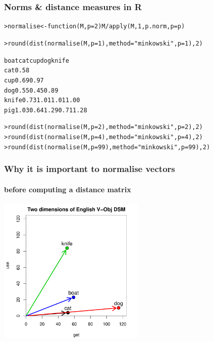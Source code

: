 \begin{frame}[fragile]
  \frametitle{Norms \& distance measures in R}

\ungap
\begin{alltt}\small    
{}
> normalise <- function (M, p=2) M / apply(M, 1, p.norm, p=p)

> round(dist(normalise(M, p=1), method="minkowski", p=1), 2) \begin{Rout}
      boat  cat  cup  dog knife
cat   0.58                     
cup   0.69 0.97                
dog   0.55 0.45 0.89           
knife 0.73 1.01 1.01 1.00      
pig   1.03 0.64 1.29 0.71  1.28 \end{Rout}

> round(dist(normalise(M, p=2), method="minkowski", p=2), 2)
> round(dist(normalise(M, p=4), method="minkowski", p=4), 2)
> round(dist(normalise(M, p=99), method="minkowski", p=99), 2)
\end{alltt}
\end{frame}

\begin{frame}[c]
  \frametitle{Why it is important to normalise vectors}
  \framesubtitle{before computing a distance matrix}

  \begin{center}
    \includegraphics[width=7cm]{img/hieroglyph_2d_3}
  \end{center}
\end{frame}


